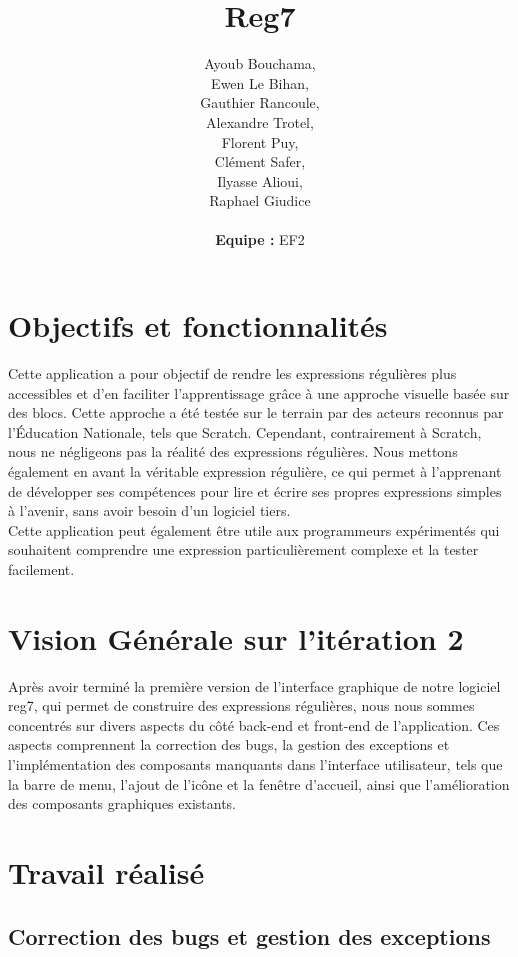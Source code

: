 \documentclass{article}
\title{\textbf{Reg7}}
\author{
Ayoub Bouchama,\\
Ewen Le Bihan,\\
Gauthier Rancoule,\\
Alexandre Trotel,\\
Florent Puy,\\
Clément Safer,\\
Ilyasse Alioui,\\
Raphael Giudice\\\\
\textbf{Equipe :} EF2
}
\date
\begin{document}
\maketitle

\newpage
\tableofcontents

\newpage

\section{Objectifs et fonctionnalités}

Cette application a pour objectif de rendre les expressions régulières plus accessibles et d'en faciliter l'apprentissage grâce à une approche visuelle basée sur des blocs. Cette approche a été testée sur le terrain par des acteurs reconnus par l'Éducation Nationale, tels que Scratch. Cependant, contrairement à Scratch, nous ne négligeons pas la réalité des expressions régulières. Nous mettons également en avant la véritable expression régulière, ce qui permet à l'apprenant de développer ses compétences pour lire et écrire ses propres expressions simples à l'avenir, sans avoir besoin d'un logiciel tiers.\\

Cette application peut également être utile aux programmeurs expérimentés qui souhaitent comprendre une expression particulièrement complexe et la tester facilement.
\section{Vision Générale sur l'itération 2}

Après avoir terminé la première version de l'interface graphique de notre logiciel reg7, qui permet de construire des expressions régulières, nous nous sommes concentrés sur divers aspects du côté back-end et front-end de l'application. Ces aspects comprennent la correction des bugs, la gestion des exceptions et l'implémentation des composants manquants dans l'interface utilisateur, tels que la barre de menu, l'ajout de l'icône et la fenêtre d'accueil, ainsi que l'amélioration des composants graphiques existants.

\section{Travail réalisé}

\subsection{Correction des bugs et gestion des exceptions}
\end{document}
